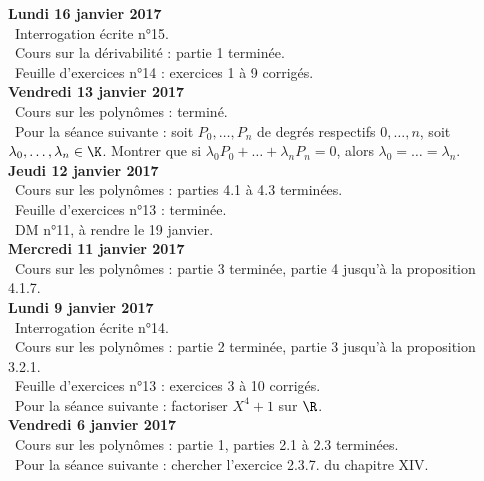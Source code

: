 \documentclass[12pt,a4paper]{article}
\begin{document}
\noindent\textbf{Lundi 16 janvier 2017}\\
\bu\ Interrogation écrite n°15.\\
\bu\ Cours sur la dérivabilité : partie 1 terminée.\\
\bu\ Feuille d'exercices n°14 : exercices 1 à 9 corrigés. \vspace{.4cm}\\

\noindent\textbf{Vendredi 13 janvier 2017}\\
\bu\ Cours sur les polynômes : terminé.\\
\bu\ Pour la séance suivante : soit $P_0,\dots,P_n$ de degrés respectifs $0,\dots,n$, soit $\lambda_0,\dots,\lambda_n \in \K$. Montrer que si $\lambda_0 P_0 + \dots + \lambda_nP_n = 0$, alors $\lambda_0 = \dots = \lambda_n$. \vspace{.4cm}\\


\noindent\textbf{Jeudi 12 janvier 2017}\\
\bu\ Cours sur les polynômes : parties 4.1 à 4.3 terminées.\\
\bu\ Feuille d'exercices n°13 : terminée.\\
\bu\ DM n°11, à rendre le 19 janvier.\vspace{.4cm}\\

\noindent\textbf{Mercredi 11 janvier 2017}\\
\bu\ Cours sur les polynômes : partie 3 terminée, partie 4 jusqu'à la proposition 4.1.7.\vspace{.4cm}\\

\noindent\textbf{Lundi 9 janvier 2017}\\
\bu\ Interrogation écrite n°14.\\
\bu\ Cours sur les polynômes : partie 2 terminée, partie 3 jusqu'à la proposition 3.2.1.\\
\bu\ Feuille d'exercices n°13 : exercices 3 à 10 corrigés.\\
\bu\ Pour la séance suivante : factoriser $X^4+1$ sur $\R$.\vspace{.4cm}\\

\noindent\textbf{Vendredi 6 janvier 2017}\\
\bu\ Cours sur les polynômes : partie 1, parties 2.1 à 2.3 terminées.\\
\bu\ Pour la séance suivante : chercher l'exercice 2.3.7. du chapitre XIV.\vspace{.4cm}\\
\end{document}
